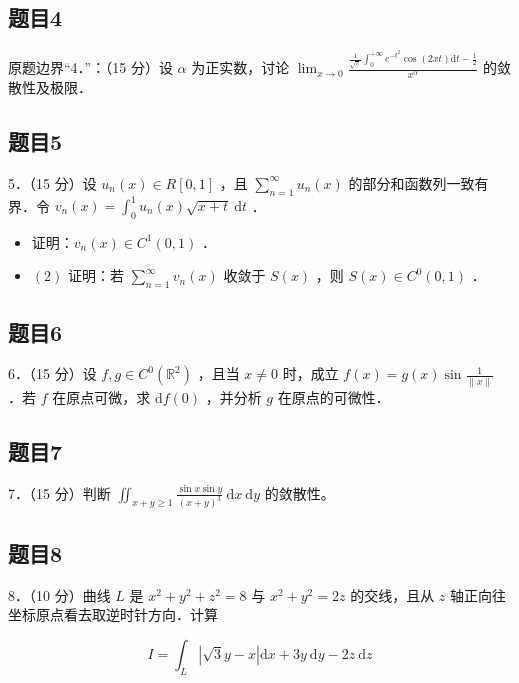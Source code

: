 \documentclass{article}
\begin{document}
\subsection{题目4}
原题边界“4．”：（15 分）设 \(\alpha\) 为正实数，讨论 \(\lim _{x \rightarrow 0} \frac{\frac{1}{\sqrt{\pi}} \int_{0}^{+\infty} e^{-t^{2}} \cos (2 x t) \mathrm{d} t-\frac{1}{2}}{x^{\alpha}}\) 的敛散性及极限．

\subsection{题目5}
5．（15 分）设 \(u_{n}(x) \in R[0,1]\) ，且 \(\sum_{n=1}^{\infty} u_{n}(x)\) 的部分和函数列一致有界．令 \(v_{n}(x)=\int_{0}^{1} u_{n}(x) \sqrt{x+t} \mathrm{~d} t\) ．

\begin{itemize}
  \item[（1）] 证明：\(v_{n}(x) \in C^{1}(0,1)\) ．
  \item[] \((2)\) 证明：若 \(\sum_{n=1}^{\infty} v_{n}(x)\) 收敛于 \(S(x)\) ，则 \(S(x) \in C^{0}(0,1)\) ．
\end{itemize}

\subsection{题目6}
6．（15 分）设 \(f, g \in C^{0}\left(\mathbb{R}^{2}\right)\) ，且当 \(x \neq 0\) 时，成立 \(f(x)=g(x) \sin \frac{1}{\|x\|}\) ．若 \(f\) 在原点可微，求 \(\mathrm{d} f(0)\) ，并分析 \(g\) 在原点的可微性．

\subsection{题目7}
7．（15 分）判断 \(\iint_{x+y \geq 1} \frac{\sin x \sin y}{(x+y)^{3}} \mathrm{~d} x \mathrm{~d} y\) 的敛散性。

\subsection{题目8}
8．（10 分）曲线 \(L\) 是 \(x^{2}+y^{2}+z^{2}=8\) 与 \(x^{2}+y^{2}=2 z\) 的交线，且从 \(z\) 轴正向往坐标原点看去取逆时针方向．计算

\[
I=\int_{L}|\sqrt{3} y-x| \mathrm{d} x+3 y \mathrm{~d} y-2 z \mathrm{~d} z
\]
\end{document}
